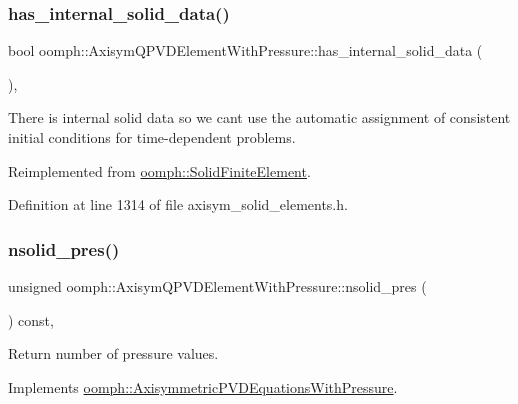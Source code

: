 \subsubsection{\texorpdfstring{has\+\_\+internal\+\_\+solid\+\_\+data()}{has\_internal\_solid\_data()}}
{\footnotesize\ttfamily bool oomph\+::\+Axisym\+Q\+P\+V\+D\+Element\+With\+Pressure\+::has\+\_\+internal\+\_\+solid\+\_\+data (\begin{DoxyParamCaption}{ }\end{DoxyParamCaption})\hspace{0.3cm}{\ttfamily [inline]}, {\ttfamily [virtual]}}



There is internal solid data so we can\textquotesingle{}t use the automatic assignment of consistent initial conditions for time-\/dependent problems. 



Reimplemented from \hyperlink{classoomph_1_1SolidFiniteElement_aa68837a8f6d1cb021d5cae9c2968a6f3}{oomph\+::\+Solid\+Finite\+Element}.



Definition at line 1314 of file axisym\+\_\+solid\+\_\+elements.\+h.

\mbox{\label{classoomph_1_1AxisymQPVDElementWithPressure_ac39d97adf69f12b20640ae10aeaec156}} 
\subsubsection{\texorpdfstring{nsolid\+\_\+pres()}{nsolid\_pres()}}
{\footnotesize\ttfamily unsigned oomph\+::\+Axisym\+Q\+P\+V\+D\+Element\+With\+Pressure\+::nsolid\+\_\+pres (\begin{DoxyParamCaption}{ }\end{DoxyParamCaption}) const\hspace{0.3cm}{\ttfamily [inline]}, {\ttfamily [virtual]}}



Return number of pressure values. 



Implements \hyperlink{classoomph_1_1AxisymmetricPVDEquationsWithPressure_a4cfeab9fe5e9c26fcf39659bacc53a8f}{oomph\+::\+Axisymmetric\+P\+V\+D\+Equations\+With\+Pressure}.



